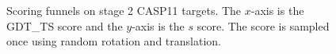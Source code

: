 \documentclass[letter,10pt]{article}
\begin{document}
\begin{figure}[H]
    \vspace{-2em}
    \centering
    \caption{Scoring funnels on stage 2 CASP11 targets. The
      $x$-axis is the GDT\_TS score and the $y$-axis is the $s$
      score. The score is sampled once using random rotation and
      translation.}
    \label{Fig:Satage2CASP11Funnels}
\end{figure}
\end{document}
